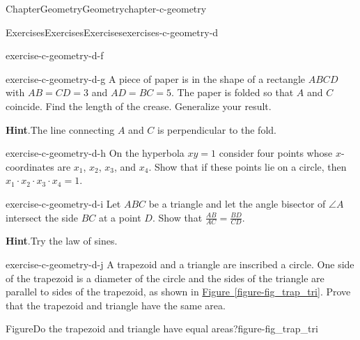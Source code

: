 \documentclass[oneside,10pt,]{book}
\newcommand{\blocktitlefont}{\relax}
\newcommand{\xreffont}{\relax}
\numberwithin{equation}{section}
\begin{document}
\begin{chapterptx}{Chapter}{Geometry}{}{Geometry}{}{}{chapter-c-geometry}
\begin{exercises-section}{Exercises}{Exercises}{}{Exercises}{}{}{exercises-c-geometry-d}
\begin{divisionexercise}{5}{}{}{exercise-c-geometry-d-f}
\end{divisionexercise}%
\begin{divisionexercise}{6}{}{}{exercise-c-geometry-d-g}%
A piece of paper is in the shape of a rectangle \(ABCD\) with \(AB=CD=3\) and \(AD=BC=5\). The paper is folded so that \(A\) and \(C\) coincide. Find the length of the crease.  Generalize your result.%
\par\smallskip%
\noindent\textbf{\blocktitlefont Hint}.\hypertarget{hint-c-geometry-d-g-b}{}\quad{}The line connecting \(A\) and \(C\) is perpendicular to the fold.%
\end{divisionexercise}%
\begin{divisionexercise}{7}{}{}{exercise-c-geometry-d-h}%
On the hyperbola \(x y = 1\) consider four points whose \(x\)-coordinates are \(x_1\), \(x_2\), \(x_3\), and \(x_4\). Show that if these points lie on a circle, then \(x_1 \cdot  x_{2} \cdot x_{3}\cdot x_4 = 1\).%
\end{divisionexercise}%
\begin{divisionexercise}{8}{}{}{exercise-c-geometry-d-i}%
Let \(ABC\) be a triangle and let the angle bisector of \(\angle A\) intersect the side \(BC\) at a point \(D\). Show that \(\frac{A B}{A C} = \frac{B D}{C D}\).%
\par\smallskip%
\noindent\textbf{\blocktitlefont Hint}.\hypertarget{hint-c-geometry-d-i-b}{}\quad{}Try the law of sines.%
\end{divisionexercise}%
\begin{divisionexercise}{9}{}{}{exercise-c-geometry-d-j}%
A trapezoid and a triangle are inscribed a circle. One side of the trapezoid is a diameter of the circle and the sides of the  triangle are parallel to sides of the trapezoid, as shown in \hyperref[figure-fig_trap_tri]{Figure~{\xreffont\ref{figure-fig_trap_tri}}}. Prove that the trapezoid and triangle have the same area.%
\begin{figureptx}{Figure}{Do the trapezoid and triangle have equal areas?}{figure-fig_trap_tri}{}%
\begin{image}{0.2}{0.6}{0.2}{}%

\end{image}
\end{figureptx}
\end{divisionexercise}
\end{exercises-section}
\end{chapterptx}
\end{document}
